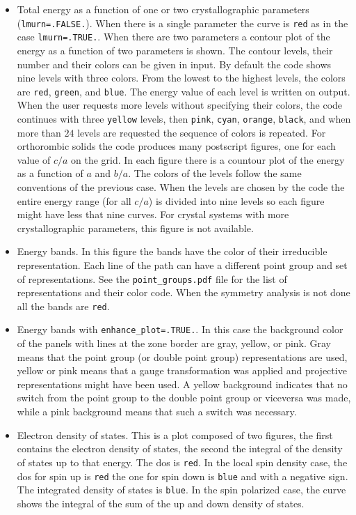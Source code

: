 \documentclass[12pt,a4paper]{article}
\begin{document}
\begin{itemize}
\item
Total energy as a function of one or two crystallographic parameters
(\texttt{lmurn=.FALSE.}). When there is a single parameter the curve is
\texttt{red} as in the case \texttt{lmurn=.TRUE.}. When there are two
parameters a contour plot of the energy as a function of two parameters
is shown. The contour levels, their number and their colors can be
given in input. By default the code shows nine levels with three
colors. From the lowest to the highest levels, the colors are \texttt{red},
\texttt{green}, and \texttt{blue}. The energy value of each level is 
written on output. When the user requests more levels without specifying
their colors, the code continues with three \texttt{yellow} levels, 
then \texttt{pink}, \texttt{cyan}, \texttt{orange}, \texttt{black}, and
when more than $24$ levels are requested the sequence of colors is repeated.
For orthorombic solids the code produces many postscript figures, one
for each value of $c/a$ on the grid. In each figure there is a countour
plot of the energy as a function of $a$ and $b/a$. The colors of the levels
follow the same conventions of the previous case. When the levels are chosen
by the code the entire energy range (for all $c/a$) is divided into nine
levels so each figure might have less that nine curves.
For crystal systems with more crystallographic parameters, this figure is
not available.

\item
Energy bands. In this figure the bands have the color of
their irreducible representation. Each line of the path can have a different
point group and set of representations. See the \texttt{point\_groups.pdf} file
for the list of representations and their color code. 
When the symmetry analysis is not done all the bands are \texttt{red}.

\item
Energy bands with \texttt{enhance\_plot=.TRUE.}. In this case 
the background color of the panels with lines at the zone border are 
gray, yellow, or pink. Gray means that the point group (or double point
group) representations are used, yellow or pink means that a gauge 
transformation was applied and projective representations might have been used. 
A yellow background indicates that no switch 
from the point group to the double point group or viceversa was made, 
while a pink background means that such a switch was necessary.
                              
\item
Electron density of states. This is a plot composed of two figures,
the first contains the electron density of states, the second the integral
of the density of states up to that energy. The dos is \texttt{red}.
In the local spin density case, the dos for spin up is \texttt{red} the
one for spin down is \texttt{blue} and with a negative sign.          
The integrated density of states is \texttt{blue}. In the spin polarized
case, the curve shows the integral of the sum of the up and down density 
of states.


\end{itemize}
\end{document}
